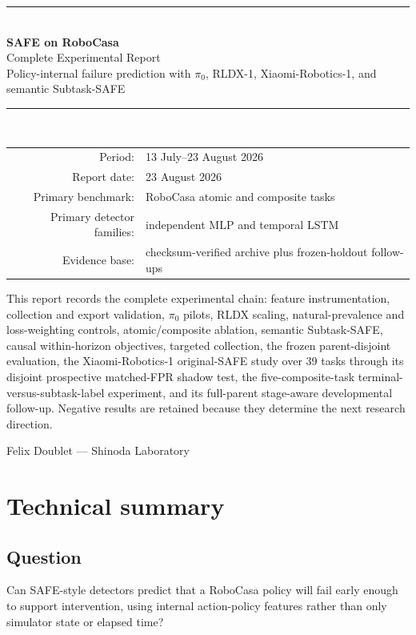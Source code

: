\documentclass[11pt,a4paper]{article}
\begin{document}
\begin{titlepage}
\centering
\vspace*{20mm}
{\color{navy}\rule{\textwidth}{1.4pt}}\\[12mm]
{\Huge\bfseries SAFE on RoboCasa\\[4mm]}
{\LARGE Complete Experimental Report}\\[12mm]
{\large Policy-internal failure prediction with $\pi_0$, RLDX-1, Xiaomi-Robotics-1, and semantic Subtask-SAFE}\\[16mm]
{\color{navy}\rule{\textwidth}{1.4pt}}\\[18mm]
\begin{tabular}{rl}
Period: & 13 July--23 August 2026\\
Report date: & 23 August 2026\\
Primary benchmark: & RoboCasa atomic and composite tasks\\
Primary detector families: & independent MLP and temporal LSTM\\
Evidence base: & checksum-verified archive plus frozen-holdout follow-ups\\
\end{tabular}
\vfill
\begin{minipage}{0.86\textwidth}
\small
This report records the complete experimental chain: feature instrumentation, collection and export validation, $\pi_0$ pilots, RLDX scaling, natural-prevalence and loss-weighting controls, atomic/composite ablation, semantic Subtask-SAFE, causal within-horizon objectives, targeted collection, the frozen parent-disjoint evaluation, the Xiaomi-Robotics-1 original-SAFE study over 39 tasks through its disjoint prospective matched-FPR shadow test, the five-composite-task terminal-versus-subtask-label experiment, and its full-parent stage-aware developmental follow-up. Negative results are retained because they determine the next research direction.
\end{minipage}
\vfill
{\small Felix Doublet --- Shinoda Laboratory}
\end{titlepage}

\tableofcontents
\clearpage

\section{Technical summary}

\subsection{Question}
Can SAFE-style detectors predict that a RoboCasa policy will fail early enough to support intervention, using internal action-policy features rather than only simulator state or elapsed time?
\end{document}

